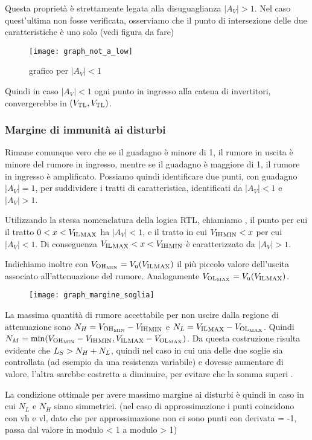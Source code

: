 \documentclass[../template]{subfiles}
\begin{document}
Questa proprietà è strettamente legata alla disuguaglianza $|A_V| > 1$. Nel caso quest'ultima non fosse verificata,
osserviamo che il punto di intersezione delle due caratteristiche è uno solo (vedi figura da fare)

\begin{figure}[h]
    \centering
    \texttt{[image: graph\_not\_a\_low]}
    \caption{grafico per $|A_V| < 1$}
\end{figure}

Quindi in caso $|A_V| < 1$ ogni punto in ingresso alla catena di invertitori, convergerebbe in $(V_{\text{TL}}, V_{\text{TL}})$.
\newpage
\subsubsection{Margine di immunità ai disturbi}
Rimane comunque vero che se il guadagno è minore di 1, il rumore in uscita è minore del rumore in ingresso, mentre se il
guadagno è maggiore di 1, il rumore in ingresso è amplificato.  Possiamo quindi identificare due punti, con guadagno
$|A_V| = 1$, per suddividere i tratti di caratteristica, identificati da $|A_V| < 1$ e $|A_V| > 1$.

Utilizzando la stessa nomenclatura della logica RTL, chiamiamo \vilmax, il punto per cui il tratto $0 < x < {V_{\text{IL}}}_\text{MAX}$ ha
$|A_V| < 1$, e \vihmin il tratto in cui ${V_{\text{IH}}}_\text{MIN} < x$ per cui $|A_V| < 1$. Di conseguenza ${V_{\text{IL}}}_\text{MAX} < x < {V_{\text{IH}}}_\text{MIN}$ è
caratterizzato da $|A_V| > 1$.


Indichiamo inoltre con $V_{\text{OH}_\text{MIN}} = V_{\text{u}}({V_{\text{IL}}}_\text{MAX})$ il più piccolo valore dell'uscita associato all'attenuazione
del rumore. Analogamente $V_{\text{OL}_\text{MAX}}=V_{\text{u}}({V_{\text{IL}}}_\text{MAX})$.

\begin{figure}[h]
    \centering
    \texttt{[image: graph\_margine\_soglia]}
\end{figure}

La massima quantità di rumore accettabile per non uscire dalla regione di attenuazione sono $N_H = V_{\text{OH}_\text{MIN}} - {V_{\text{IH}}}_\text{MIN}$ e
$N_L = {V_{\text{IL}}}_\text{MAX} - V_{\text{OL}_\text{MAX}}$. Quindi $N_M = \min(V_{\text{OH}_\text{MIN}} - {V_{\text{IH}}}_\text{MIN}, {V_{\text{IL}}}_\text{MAX} - V_{\text{OL}_\text{MAX}})$.
Da questa costruzione risulta evidente che $L_S > N_H + N_L$, quindi nel caso in cui una delle due soglie sia
controllata (ad esempio da una resistenza variabile) e dovesse aumentare di valore, l'altra sarebbe costretta a
diminuire, per evitare che la somma superi \ls.

La condizione ottimale per avere massimo margine ai disturbi è quindi in caso in cui $N_L$ e $N_H$ siano simmetrici.
(nel caso di approssimazione i punti coincidono con vh e vl, dato che per approssimazione non ci sono punti con derivata
= -1, passa dal valore in modulo < 1 a modulo > 1)
\end{document}

